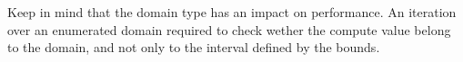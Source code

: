 \documentclass[11pt]{amsart}
\begin{document}
Keep in mind that the domain type has an impact on performance. An iteration over an enumerated domain required to check wether the compute value belong to the domain, and not only to the interval defined by the bounds. 




\end{document}
